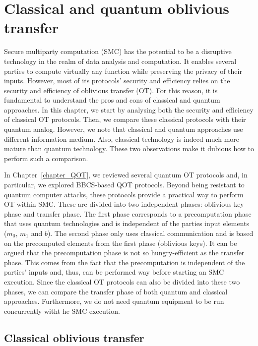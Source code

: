 


%

\chapter{Classical and quantum oblivious transfer}

Secure multiparty computation (SMC) has the potential to be a disruptive technology in the realm of data analysis and computation. It enables several parties to compute virtually any function while preserving the privacy of their inputs. However, most of its protocols’ security and efficiency relies on the security and efficiency of oblivious transfer (OT). For this reason, it is fundamental to understand the pros and cons of classical and quantum approaches. In this chapter, we start by analysing both the security and efficiency of classical OT protocols. Then, we compare these classical protocols with their quantum analog. However, we note that classical and quantum approaches use different information medium. Also, classical technology is indeed much more mature than quantum technology. These two observations make it dubious how to perform such a comparison. 

In Chapter~\ref{chapter_QOT}, we reviewed several quantum OT protocols and, in particular, we explored BBCS-based QOT protocols. Beyond being resistant to quantum computer attacks, these protocols provide a practical way to perform OT within SMC. These are divided into two independent phases: oblivious key phase and transfer phase. The first phase corresponds to a precomputation phase that uses quantum technologies and is independent of the parties input elements ($m_0$, $m_1$ and $b$). The second phase only uses classical communication and is based on the precomputed elements from the first phase (oblivious keys). It can be argued that the precomputation phase is not so hungry-efficient as the transfer phase. This comes from the fact that the precomputation is independent of the parties' inputs and, thus, can be performed way before starting an SMC execution. Since the classical OT protocols can also be divided into these two phases, we can compare the transfer phase of both quantum and classical approaches. Furthermore, we do not need quantum equipment to be run concurrently witht he SMC execution.


\section{Classical oblivious transfer}



